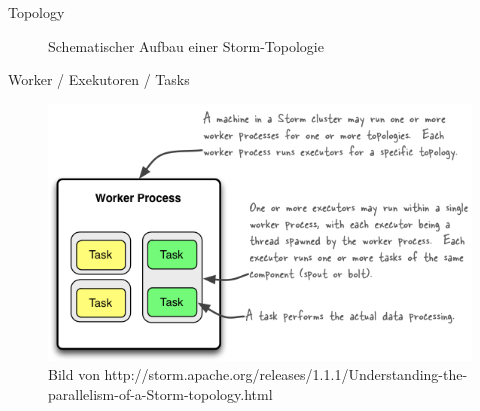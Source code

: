 \documentclass{beamer}
\begin{document}
\begin{frame}[t]{Topology}
\begin{figure}[h]
	\center
	\scalebox{.7}{}
	\caption{Schematischer Aufbau einer Storm-Topologie}
	\label{fig:topology}
\end{figure}

\end{frame}

\begin{frame}[t]{Worker / Exekutoren / Tasks}
\begin{figure}
  \centering
	\includegraphics[scale=0.8,natwidth=563,natheight=341]{img/relationships-worker-processes-executors-tasks.png}
  \caption{ Bild von http://storm.apache.org/releases/1.1.1/Understanding-the-parallelism-of-a-Storm-topology.html}
\end{figure}
\end{frame}
\end{document}
